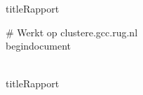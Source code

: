 \documentclass[a4paper,12pt]{article}
\begin{document}
\\\\title{Rapport}

# Werkt op clustere.gcc.rug.nl
\\begin{document}

\\title{Rapport}
\end{document}
